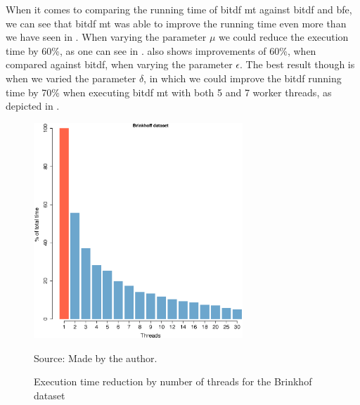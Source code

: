 {When it comes to comparing the running time of \ac{bitdf} \ac{mt} against \ac{bitdf} and \ac{bfe}, we can see that
\ac{bitdf} \ac{mt} was able to improve the running time even more than we have seen in . When varying
the parameter $\mu$ we could reduce the execution time by 60\%, as one can see in .
 also shows improvements of 60\%, when compared against \ac{bitdf}, when varying the
parameter $\epsilon$. The best result though is when we varied the parameter $\delta$, in which we could improve the
\ac{bitdf} running time by 70\% when executing \ac{bitdf} \ac{mt} with both 5 and 7 worker threads, as depicted in
.

\begin{figure}[h!]
    \centering
    \caption{Execution time reduction by number of threads for the Brinkhof dataset}
    \centerline{\includegraphics[width=0.7\textwidth]{images/Brinkhoff_thread.eps}}
    \footnotesize{Source: Made by the author.}
    \label{fig:brinkhoff_threads}
\end{figure}

}
